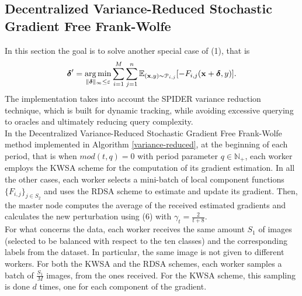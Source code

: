 \subsection{Decentralized Variance-Reduced Stochastic Gradient Free Frank-Wolfe}
In this section the goal is to solve another special case of (1), that is
\begin{equation}
	\mbox{\boldmath$ \delta$}' = \operatorname*{arg\,min}_{\lVert \mbox{\boldmath$\scriptstyle \delta$}\rVert_{\infty}\leq\varepsilon} \sum_{i=1}^M \sum_{j=1}^n \mathbb{E}_{(\mathbf{x},y)\sim \mathcal{P}_{i,j}}[- F_{i,j}(\mathbf{x}+\mbox{\boldmath$ \delta$},y)].
\end{equation}
The implementation takes into account the SPIDER variance reduction technique, which is built for dynamic tracking, while avoiding excessive querying to oracles and ultimately reducing query complexity.\\
In the Decentralized Variance-Reduced Stochastic Gradient Free Frank-Wolfe method implemented in Algorithm \ref{variance-reduced},
at the beginning of each period, that is when $mod(t,q)=0$ with period parameter $q \in \mathbb{N}_{+}$, each worker employs the KWSA scheme for the computation of its gradient estimation. In all the other cases, each worker selects a mini-batch of local component functions $\{F_{i,j}\}_{j\in S_2}$ and uses the RDSA scheme to estimate and update its gradient. Then, the master node computes the average of the received estimated gradients and calculates the new perturbation using (6) with $\gamma_t = \frac{2}{t+8}$.\\
For what concerns the data, each worker receives the same amount $S_1$ of images (selected to be balanced with respect to the ten classes) and the corresponding labels from the dataset. In particular, the same image is not given to different workers. For both the KWSA and the RDSA schemes, each worker samples a batch of $\frac{S_1}{M}$ images, from the ones received. For the KWSA scheme, this sampling is done $d$ times, one for each component of the gradient.  

